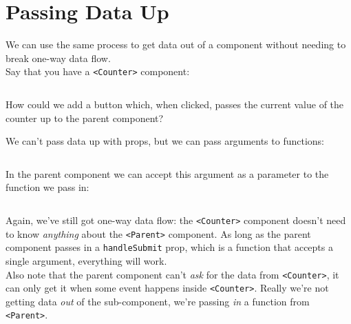 \section{Passing Data Up}

We can use the same process to get data out of a component without needing to break one-way data flow.
\\

Say that you have a \texttt{<Counter>} component:

\inputminted{jsx}{05-one-way-data-flow/figures/07-Counter.jsx}

How could we add a button which, when clicked, passes the current value of the counter up to the parent component?


\pagebreak


We can't pass data up with props, but we can pass arguments to functions:

\inputminted{jsx}{05-one-way-data-flow/figures/08-Counter-with-parent.jsx}

In the parent component we can accept this argument as a parameter to the function we pass in:

\inputminted{jsx}{05-one-way-data-flow/figures/09-Parent.jsx}

Again, we've still got one-way data flow: the \texttt{<Counter>} component doesn't need to know \textit{anything} about the \texttt{<Parent>} component. As long as the parent component passes in a \texttt{handleSubmit} prop, which is a function that accepts a single argument, everything will work.
\\

Also note that the parent component can't \textit{ask} for the data from \texttt{<Counter>}, it can only get it when some event happens inside \texttt{<Counter>}. Really we're not getting data \textit{out} of the sub-component, we're passing \textit{in} a function from \texttt{<Parent>}.
